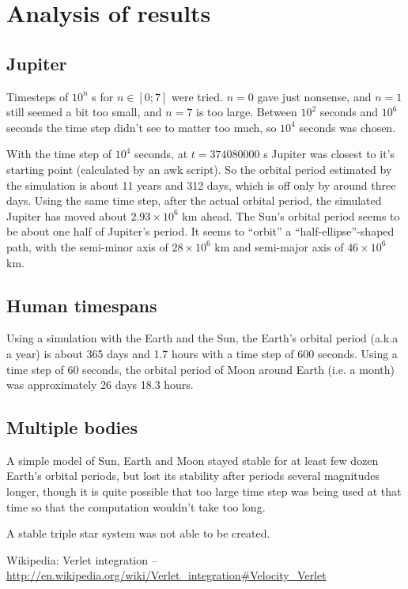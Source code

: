 \documentclass[a4paper]{article}
\begin{document}
   \section{Analysis of results}
   \subsection{Jupiter}
   Timesteps of $10^n$ s for $n \in [0; 7]$ were tried. $n = 0$ gave just nonsense, and $n = 1$ still seemed a bit too small, and $n = 7$ is too large.
   Between $10^2$ seconds and $10^6$ seconds the time step didn't see to matter too much, so $10^4$ seconds was chosen.

   With the time step of $10^4$ seconds, at $t = 374080000$ s Jupiter was closest to it's starting point (calculated by an awk script).
   So the orbital period estimated by the simulation is about 11 years and 312 days, which is off only by around three days.
   Using the same time step, after the actual orbital period, the simulated Jupiter has moved about $2.93 \times 10^6$ km ahead.
   The Sun's orbital period seems to be about one half of Jupiter's period.
   It seems to ``orbit'' a ``half-ellipse''-shaped path, with the semi-minor axis of $ 28 \times 10^6 $ km and semi-major axis of $ 46 \times 10^6$ km.
   \subsection{Human timespans}
   Using a simulation with the Earth and the Sun, the Earth's orbital period (a.k.a a year) is about 365 days and 1.7 hours with a time step of 600 seconds.
   Using a time step of 60 seconds, the orbital period of Moon around Earth (i.e. a month) was approximately 26 days 18.3 hours.
   \subsection{Multiple bodies}
   A simple model of Sun, Earth and Moon stayed stable for at least few dozen Earth's orbital periods,
   but lost its stability after periods several magnitudes longer, though it is quite possible that too large time step was being
   used at that time so that the computation wouldn't take too long.

   A stable triple star system was not able to be created.
   \begin{thebibliography}{9}
 Wikipedia: Verlet integration -- \url{http://en.wikipedia.org/wiki/Verlet_integration#Velocity_Verlet}
\end{thebibliography}
\end{document}
